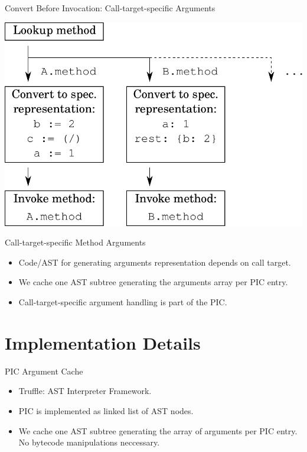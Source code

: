 \documentclass[xcolor=dvipsname]{beamer} %
\begin{document}
\begin{frame}[fragile]{Convert Before Invocation: Call-target-specific Arguments}
\begin{minipage}{0.7\textwidth}
\centering
\includegraphics[height=0.6\textheight]{convert_before3.pdf}
\end{minipage} %
\begin{minipage}{0.25\textwidth}

\end{minipage}
\end{frame}

\begin{frame}{Call-target-specific Method Arguments}
\begin{itemize}
	\item Code/AST for generating arguments representation depends on call target.
	\item We cache one AST subtree generating the arguments array per PIC entry.
	\item Call-target-specific argument handling is part of the PIC.
\end{itemize}
\end{frame}

\section{Implementation Details}
\begin{frame}{PIC Argument Cache}
\begin{itemize}
	\item Truffle: AST Interpreter Framework.
	\item PIC is implemented as linked list of AST nodes.
	\item We cache one AST subtree generating the array of arguments per PIC entry. No bytecode manipulations neccessary.
\end{itemize}
\end{frame}
\end{document}
